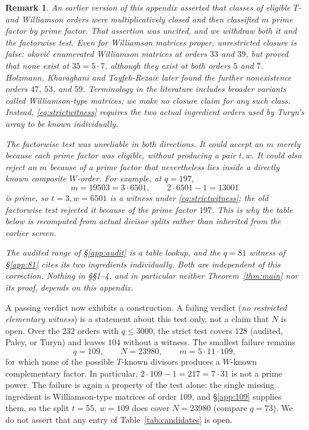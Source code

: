 \documentclass[11pt]{article}
\newtheorem{remark}{Remark}
\begin{document}
\begin{remark}\label{rem:mult}
An earlier version of this appendix asserted that classes of eligible
\(T\)- and Williamson orders were multiplicatively closed and then
classified \(m\) prime factor by prime factor.  That assertion was uncited,
and we withdraw both it and the factorwise test.  Even for Williamson
matrices proper, unrestricted closure is false:
\DJ okovi\'c \cite{Djokovic1993} enumerated Williamson matrices at orders
\(33\) and \(39\), but proved that none exist at
\(35=5\cdot7\), although they exist at both orders \(5\) and \(7\).
Holzmann, Kharaghani and Tayfeh-Rezaie
\cite{HolzmannKharaghaniTayfehRezaie2008} later found the further
nonexistence orders \(47\), \(53\), and \(59\).  Terminology in the
literature includes broader variants called Williamson-type matrices;
we make no closure claim for any such class.  Instead,
\eqref{eq:strictwitness} requires the two actual ingredient orders used
by Turyn's array to be known individually.

The factorwise test was unreliable in both directions.  It could accept
an \(m\) merely because each prime factor was eligible, without producing
a pair \(t,w\).  It could also reject an \(m\) because of a prime factor
that nevertheless lies inside a directly known composite \(W\)-order.
For example, at \(q=197\),
\[
        m=19503=3\cdot6501,\qquad 2\cdot6501-1=13001
\]
is prime, so \(t=3,w=6501\) is a witness under
\eqref{eq:strictwitness}; the old factorwise test rejected it because of
the prime factor \(197\).  This is why the table below is recomputed from
actual divisor splits rather than inherited from the earlier screen.

The audited range of \S\ref{app:audit} is a table lookup, and the
\(q=81\) witness of \S\ref{app:81} cites its two ingredients
individually.  Both are independent of this correction.  Nothing in
\S\S1--4, and in particular neither Theorem~\ref{thm:main} nor its proof,
depends on this appendix.
\end{remark}

A passing verdict now exhibits a construction.  A failing verdict
(\emph{no restricted elementary witness}) is a statement about this test
only, not a claim that \(N\) is open.  Over the \(232\) orders with
\(q\le3000\), the strict test covers \(128\) (audited, Paley, or Turyn)
and leaves \(104\) without a witness.  The smallest failure remains
\[
        q=109,\qquad N=23980,\qquad m=5\cdot11\cdot109,
\]
for which none of the possible \(T\)-known divisors produces a
\(W\)-known complementary factor.  In particular,
\(2\cdot109-1=217=7\cdot31\) is not a prime power.  The failure is
again a property of the test alone: the single missing ingredient is
Williamson-type matrices of order \(109\), and \S\ref{app:109} supplies
them, so the split \(t=55,\ w=109\) does cover \(N=23980\) (compare
\(q=73\)).  We do not assert that any entry of
Table~\ref{tab:candidates} is open.
\end{document}
